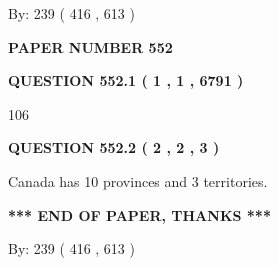 \documentclass[12pt]{article}
\begin{document}
   
\hspace{1.0in} By: 
 239 ( 416 ,  613 )
   
   
   
   
\newpage 
\setcounter{page}{ 
   552001 } 
   
   
   
   
 {\textbf{ \Large{ PAPER NUMBER  552  }}}
   
   
\vspace{0.2in}
   
   
   
   
   
   
 \vspace{0.2in}
 
 
 
 
   
   
  
\vspace{0.2in}
  
{\textbf{\Large{QUESTION
552.1 
 ( 1 , 1 , 6791 )
}}}
  
  
 
 
\noindent{}

106
 
 
  
\vspace{0.2in}
  
{\textbf{\Large{QUESTION
552.2 
 ( 2 , 2 , 3 )
}}}
  
  
 
 
\noindent{}
 
 
Canada has 10  provinces and 3 territories.
 
 
 
 
   
   
 \vspace{0.2in}
 
   
   
   
   
\vspace{1.0in} 
{\textbf{\large{ *** END OF PAPER, THANKS *** }}} 
   
   
\hspace{1.0in} By: 
 239 ( 416 ,  613 )
   
   
   
   
\newpage 
\setcounter{page}{ 
   553001 } 
   
\end{document}
